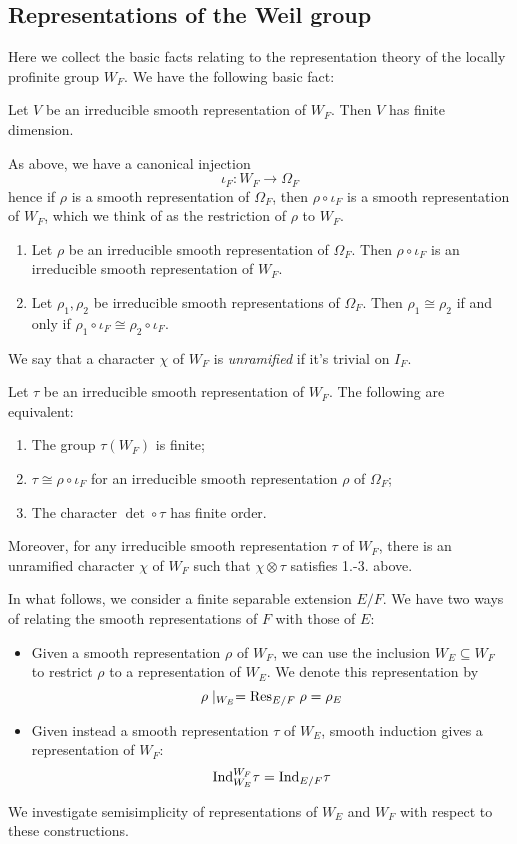 \subsection{Representations of the Weil group}
Here we collect the basic facts relating to the representation theory of the locally profinite group $W_F$. We have the following basic fact:
\begin{lemma}
	Let $V$ be an irreducible smooth representation of $W_F$. Then $V$ has finite dimension.
\end{lemma}
As above, we have a canonical injection
\[\iota_F: W_F\to \Omega_F\]
hence if $\rho$ is a smooth representation of $\Omega_F$, then $\rho\circ \iota_F$ is a smooth representation of $W_F$, which we think of as the restriction of $\rho$ to $W_F$. 
\begin{lemma}
\begin{enumerate}
	\item Let $\rho$ be an irreducible smooth representation of $\Omega_F$. Then $\rho\circ \iota_F$ is an irreducible smooth representation of $W_F$.
	\item Let $\rho_1, \rho_2$ be irreducible smooth representations of $\Omega_F$. Then $\rho_1\cong \rho_2$ if and only if $\rho_1\circ \iota_F\cong \rho_2\circ\iota_F$. 
\end{enumerate}
\end{lemma}
We say that a character $\chi$ of $W_F$ is \emph{unramified} if it's trivial on $I_F$. 
\begin{prop}
	Let $\tau$ be an irreducible smooth representation of $W_F$. The following are equivalent:
	\begin{enumerate}
		\item The group $\tau(W_F)$ is finite;
		\item $\tau \cong \rho\circ\iota_F $ for an irreducible smooth representation $\rho$ of $\Omega_F$;
		\item The character $\det \circ \tau$ has finite order.
	\end{enumerate}
	Moreover, for any irreducible smooth representation $\tau$ of $W_F$, there is an unramified character $\chi$ of $W_F$ such that $\chi\otimes \tau$ satisfies 1.-3. above.
\end{prop}
In what follows, we consider a finite separable extension $E/F$. We have two ways of relating the smooth representations of $F$ with those of $E$:
\begin{itemize}
	\item Given a smooth representation $\rho$ of $W_F$, we can use the inclusion $W_E\subseteq W_F$ to restrict $\rho$ to a representation of $W_E$. We denote this representation by 
	\[\rho\mid_{W_E} = \mathrm{Res}_{E/F} \;\rho = \rho_E\]
	\item Given instead a smooth representation $\tau$ of $W_E$, smooth induction gives a representation of $W_F$:
	\[\mathrm{Ind}_{W_E}^{W_F}\tau = \mathrm{Ind}_{E/F} \tau\]
\end{itemize}
We investigate semisimplicity of representations of $W_E$ and $W_F$ with respect to these constructions.

